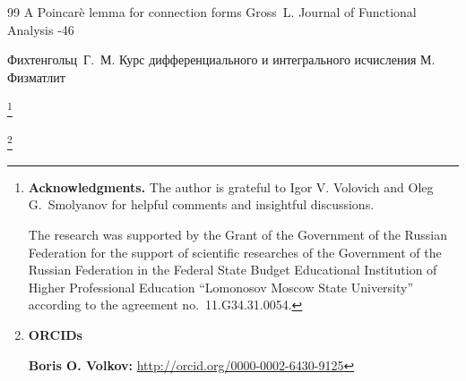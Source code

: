 \begin{thebibliography}{99}
\paper  A Poincar\`{e} lemma for connection forms
\by Gross~L.
\jour Journal of Functional Analysis
-46


\by  Фихтенгольц~Г.~М. 
\book Курс дифференциального и интегрального исчисления
\publaddr М. 
\publ Физматлит 



\end{thebibliography}

\RuDate



\makeentitle




\thanks{\textbf{Acknowledgments.} 
The author is grateful to Igor V. Volovich and Oleg G.~Smolyanov  for helpful comments and
insightful discussions. 

The research was supported by the Grant of the Government of the Russian Federation for the support of scientific
researches of the Government of the Russian Federation in the Federal State Budget Educational Institution of Higher
Professional Education ``Lomonosov Moscow State University'' according to the agreement no.~11.G34.31.0054.


}

\thanks{{\bf ORCIDs}

{\bf Boris O. Volkov:} \url{http://orcid.org/0000-0002-6430-9125}



}



\EngRef


